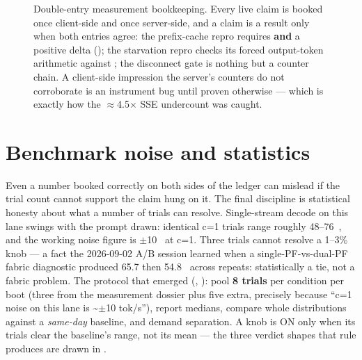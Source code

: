 \begin{figure}[htbp]
{%
}
\caption{Double-entry measurement bookkeeping. Every live claim is booked
once client-side and once server-side, and a claim is a result only when
both entries agree: the prefix-cache repro requires 
\textbf{and} a positive  delta ();
the starvation repro checks its forced output-token arithmetic against
; the disconnect gate is nothing but a counter
chain. A client-side impression the server's counters do not corroborate is
an instrument bug until proven otherwise --- which is exactly how the
$\approx$4.5$\times$ SSE undercount was caught.}
\label{fig:measure-double-entry}
\end{figure}

\section{Benchmark noise and statistics}

Even a number booked correctly on both sides of the ledger can mislead if
the trial count cannot support the claim hung on it. The final discipline is
statistical honesty about what a number of trials
can resolve. Single-stream decode on this lane swings with the prompt
drawn: identical c=1 trials range roughly 48--76~\tokspersec{}, and the working
noise figure is $\pm$10~\tokspersec{} at c=1. Three trials cannot resolve a
1--3\% knob --- a fact the 2026-09-02 A/B session learned when a
single-PF-vs-dual-PF fabric diagnostic produced 65.7 then 54.8~\tokspersec{}
across repeats: statistically a tie, not a fabric problem. The protocol
that emerged (, ): pool
\textbf{8 trials} per condition per boot (three from the measurement dossier
plus five extra, precisely because ``c=1 noise on this lane is
\textasciitilde{}$\pm$10 tok/s''), report medians, compare whole
distributions against a \emph{same-day} baseline, and demand separation.
A knob is ON only when its trials clear the baseline's range, not its
mean --- the three verdict shapes that rule produces are drawn in
.

